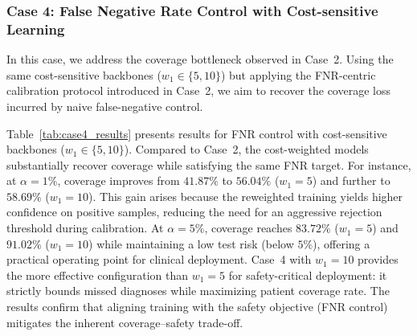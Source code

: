 \documentclass[journal,twoside,web]{ieeecolor}
\begin{document}
\subsubsection{\textbf{Case 4: False Negative Rate Control with Cost-sensitive Learning}}
\label{sec:case4_results}

In this case, we address the coverage bottleneck observed in Case~2. Using the same cost-sensitive backbones ($w_{1} \in \{5, 10\}$) but applying the FNR-centric calibration protocol introduced in Case~2, we aim to recover the coverage loss incurred by naive false-negative control.

\begin{table}[htbp]
    \centering
    \caption{The selective classification performance of Case 4 ($w_{1}=5$ and $w_{1}=10$).}
    \label{tab:case4_results}
\end{table}

Table~\ref{tab:case4_results} presents results for FNR control with cost-sensitive backbones ($w_1 \in \{5,10\}$). Compared to Case~2, the cost-weighted models substantially recover coverage while satisfying the same FNR target. For instance, at $\alpha=1\%$, coverage improves from $41.87\%$ to $56.04\%$ ($w_1=5$) and further to $58.69\%$ ($w_1=10$). This gain arises because the reweighted training yields higher confidence on positive samples, reducing the need for an aggressive rejection threshold during calibration. At $\alpha=5\%$, coverage reaches $83.72\%$ ($w_1=5$) and $91.02\%$ ($w_1=10$) while maintaining a low test risk (below $5\%$), offering a practical operating point for clinical deployment. Case~4 with $w_1 = 10$ provides the more effective configuration than $w_1 = 5$ for safety-critical deployment: it strictly bounds missed diagnoses while maximizing patient coverage rate.
The results confirm that aligning training with the safety objective (FNR control) mitigates the inherent coverage–safety trade-off.
\end{document}
